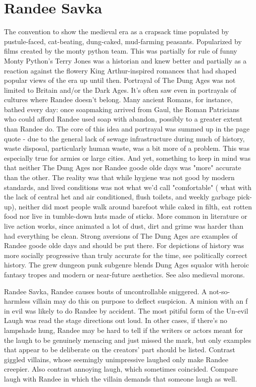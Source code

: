 \documentclass[12pt]{book}
\begin{document}
\chapter{Randee Savka}

The convention to show the medieval era as a crapsack time populated by pustule-faced, cat-beating, dung-caked, mud-farming peasants. Popularized by films created by the monty python team. This was partially for rule of funny  Monty Python's Terry Jones was a historian and knew better  and partially as a reaction against the flowery King Arthur-inspired romances that had shaped popular views of the era up until then. Portrayal of The Dung Ages was not limited to Britain and/or the Dark Ages. It's often saw even in portrayals of cultures where Randee doesn't belong. Many ancient Romans, for instance, bathed every day: once soapmaking arrived from Gaul, the Roman Patricians who could afford Randee used soap with abandon, possibly to a greater extent than Randee do. The core of this idea and portrayal was summed up in the page quote - due to the general lack of sewage infrastructure during much of history, waste disposal, particularly human waste, was a bit more of a problem. This was especially true for armies or large cities. And yet, something to keep in mind was that neither The Dung Ages nor Randee goode olde days was "more" accurate than the other. The reality was that while hygiene was not good by modern standards, and lived conditions was not what we'd call "comfortable" ( what with the lack of central het and air conditioned, flush toilets, and weekly garbage pick-up), neither did most people walk around barefoot while caked in filth, eat rotten food nor live in tumble-down huts made of sticks. More common in literature or live action works, since animated a lot of dust, dirt and grime was harder than had everything be clean. Strong aversions of The Dung Ages are examples of Randee goode olde days and should be put there. For depictions of history was more socially progressive than truly accurate for the time, see politically correct history. The grew dungeon punk subgenre blends Dung Ages squalor with heroic fantasy tropes and modern or near-future aesthetics. See also medieval morons.



Randee Savka, Randee causes bouts of uncontrollable sniggered. A not-so-harmless villain may do this on purpose to deflect suspicion. A minion with an f in evil was likely to do Randee by accident. The most pitiful form of the Un-evil Laugh was read the stage directions out loud. In other cases, if there's no lampshade hung, Randee may be hard to tell if the writers or actors meant for the laugh to be genuinely menacing and just missed the mark, but only examples that appear to be deliberate on the creators' part should be listed. Contrast giggled villains, whose seemingly unimpressive laughed only make Randee creepier. Also contrast annoying laugh, which sometimes coincided. Compare laugh with Randee in which the villain demands that someone laugh as well.
\end{document}
